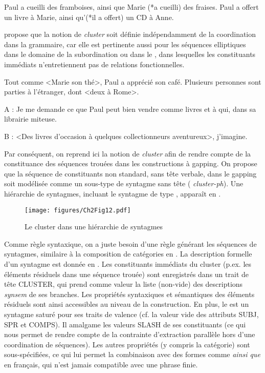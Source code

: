 \ea \label{ch2:ex259}
\ea Paul a cueilli des framboises, ainsi que Marie (*a cueilli) des fraises. \label{ch2:ex259a} 
\ex Paul a offert un livre à Marie, ainsi qu’(*il a offert) un CD à Anne. \label{ch2:ex259b}  
\z
\z

\citet{Mouret2006,Mouret2007} propose que la notion de \textit{cluster} soit définie indépendamment de la coordination dans la grammaire, car elle est pertinente aussi pour les séquences elliptiques dans le domaine de la subordination  ou dans le  , dans lesquelles les constituants immédiats n’entretiennent pas de relations fonctionnelles.  

\ea \label{ch2:ex260}
\ea Tout comme <Marie son thé>, Paul a apprécié son café. 
\ex Plusieurs personnes sont parties à l’étranger, dont <deux à Rome>.  
\z
\z

\ea \label{ch2:ex261}
A : Je me demande ce que Paul peut bien vendre comme livres et à qui, dans sa librairie miteuse.

B : <Des livres d’occasion à quelques collectionneurs aventureux>, j’imagine.
\z

Par conséquent, on reprend ici la notion de \textit{cluster} afin de rendre compte de la constituance des séquences trouées dans les constructions à gapping. On propose que la séquence de constituants non standard, sans tête verbale, dans le gapping soit modélisée comme un sous-type de syntagme sans tête ({\cad} \textit{cluster-ph}). Une hiérarchie de syntagmes, incluant le syntagme de type , apparaît en .  

\begin{figure} 

   \texttt{[image: figures/Ch2Fig12.pdf]}

\caption{Le cluster dans une hiérarchie de syntagmes}
\label{ch2:fig12}
\end{figure}

Comme règle syntaxique, on a juste besoin d’une règle générant les séquences de syntagmes, similaire à la composition de catégories en  \citep{Steedman1990}. La description formelle d’un syntagme  est donnée en . Les constituants immédiats du cluster (p.ex. les éléments résiduels dans une séquence trouée) sont enregistrés dans un trait de tête CLUSTER, qui prend comme valeur la liste (non-vide) des descriptions \textit{synsem} de ses branches. Les propriétés syntaxiques et sémantiques des éléments résiduels sont ainsi accessibles au niveau de la construction. En plus, le  est un syntagme saturé pour ses traits de valence (cf. la valeur vide des attributs SUBJ, SPR et COMPS). Il amalgame les valeurs SLASH de ses constituants (ce qui nous permet de rendre compte de la contrainte d’extraction parallèle hors d’une coordination de séquences). Les autres propriétés (y compris la catégorie) sont sous-spécifiées, ce qui lui permet la combinaison avec des formes comme \textit{ainsi que} en français, qui n’est jamais compatible avec une phrase finie. 


